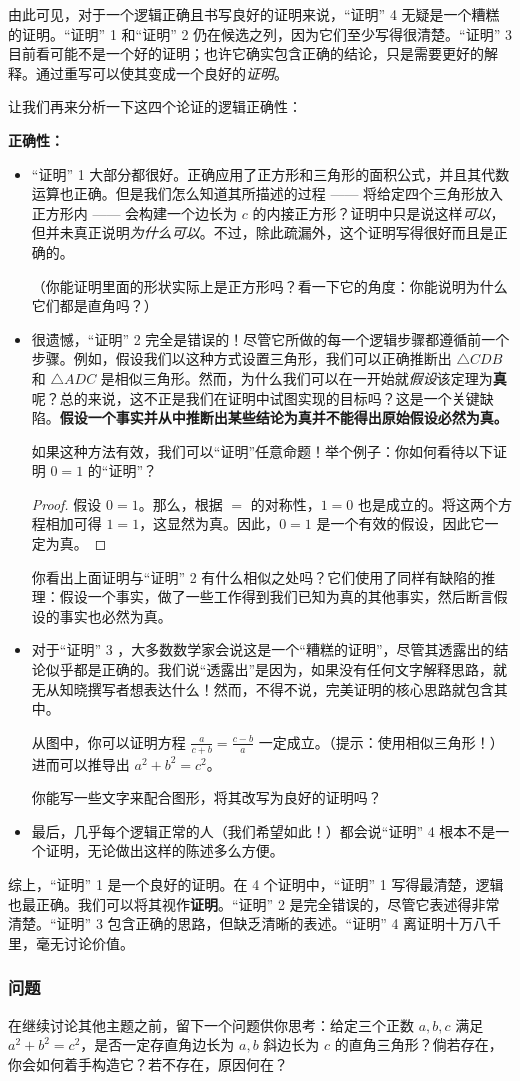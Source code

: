 由此可见，对于一个逻辑正确且书写良好的证明来说，``证明'' 4 无疑是一个糟糕的证明。``证明'' 1 和``证明'' 2 仍在候选之列，因为它们至少写得很清楚。``证明'' 3 目前看可能不是一个好的证明；也许它确实包含正确的结论，只是需要更好的解释。通过重写可以使其变成一个良好的\emph{证明}。

让我们再来分析一下这四个论证的逻辑正确性：

\textbf{正确性：}

\begin{itemize}
    \item ``证明'' 1 大部分都很好。正确应用了正方形和三角形的面积公式，并且其代数运算也正确。但是我们怎么知道其所描述的过程 —— 将给定四个三角形放入正方形内 —— 会构建一个边长为 $c$ 的内接正方形？证明中只是说这样\emph{可以}，但并未真正说明\emph{为什么可以}。不过，除此疏漏外，这个证明写得很好而且是正确的。
    
    （你能证明里面的形状实际上是正方形吗？看一下它的角度：你能说明为什么它们都是直角吗？）
    \item 很遗憾，``证明'' 2 完全是错误的！尽管它所做的每一个逻辑步骤都遵循前一个步骤。例如，假设我们以这种方式设置三角形，我们可以正确推断出 $\triangle CDB$ 和 $\triangle ADC$ 是相似三角形。然而，为什么我们可以在一开始就\emph{假设}该定理为\textbf{真}呢？总的来说，这不正是我们在证明中试图实现的目标吗？这是一个关键缺陷。\textbf{假设一个事实并从中推断出某些结论为真并不能得出原始假设必然为真。}
    
    如果这种方法有效，我们可以``证明''任意命题！举个例子：你如何看待以下证明 $0 = 1$ 的``证明''？
    \begin{proof}
        假设 $0 = 1$。那么，根据 $=$ 的对称性，$1 = 0$ 也是成立的。将这两个方程相加可得 $1 = 1$，这显然为真。因此，$0 = 1$ 是一个有效的假设，因此它一定为真。
    \end{proof}
    你看出上面证明与``证明'' 2 有什么相似之处吗？它们使用了同样有缺陷的推理：假设一个事实，做了一些工作得到我们已知为真的其他事实，然后断言假设的事实也必然为真。
    \item 对于``证明'' 3 ，大多数数学家会说这是一个``糟糕的证明''，尽管其透露出的结论似乎都是正确的。我们说``透露出''是因为，如果没有任何文字解释思路，就无从知晓撰写者想表达什么！然而，不得不说，完美证明的核心思路就包含其中。
    
    从图中，你可以证明方程 $\frac{a}{c+b} = \frac{c-b}{a}$ 一定成立。（提示：使用相似三角形！）进而可以推导出 $a^2 + b^2 = c^2$。

    你能写一些文字来配合图形，将其改写为良好的证明吗？
    \item 最后，几乎每个逻辑正常的人（我们希望如此！）都会说``证明'' 4 根本不是一个证明，无论做出这样的陈述多么方便。
\end{itemize}

综上，``证明'' 1 是一个良好的证明。在 4 个证明中，``证明'' 1 写得最清楚，逻辑也最正确。我们可以将其视作\textbf{证明}。``证明'' 2 是完全错误的，尽管它表述得非常清楚。``证明'' 3 包含正确的思路，但缺乏清晰的表述。``证明'' 4 离证明十万八千里，毫无讨论价值。

\subsubsection*{问题}

在继续讨论其他主题之前，留下一个问题供你思考：给定三个正数 $a,b,c$ 满足 $a^2+b^2=c^2$，是否一定存直角边长为 $a,b$ 斜边长为 $c$ 的直角三角形？倘若存在，你会如何着手构造它？若不存在，原因何在？
